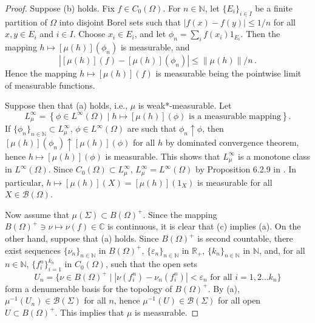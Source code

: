 \documentclass[12pt]{amsart}
\theoremstyle{definition}
\newcommand{\eps}{\varepsilon}
\newcommand{\R}{\mathbb R} %
\newcommand{\C}{\mathbb C} %
\newcommand{\N}{\mathbb N} %
\newcommand{\no}[1]{\left\|#1\right\|} %
\newcommand{\bor}[1]{\mathcal{B}(#1)} %
\newcommand{\linf}[1]{L^\infty \left( #1 \right)}
\begin{document}
\begin{proof}
Suppose (b) holds. Fix $f\in C_0 (\Omega)$. For $n \in \N$, let $\{ E_i \}_{i\in I}$ be a finite partition of $\Omega$ into disjoint Borel sets such that $|f (x) - f (y)| \leq 1/n$ for all $ x, y \in E_i$ and $i\in I$. Choose $x_i \in E_i$, and let $\phi_n = \sum_i f (x_i) 1_{E_i}$. Then the mapping $h \mapsto [\mu (h)] (\phi_n)$ is measurable, and
\begin{equation*}
\left| [\mu (h)] (f) - [\mu (h)] (\phi_n) \right| \leq \no{\mu(h)}/n \, .
\end{equation*}
Hence the mapping $h \mapsto [\mu (h)] (f)$ is measurable being the pointwise limit of measurable functions.

Suppose then that (a) holds, i.e., $\mu$ is weak*-measurable. Let
\begin{equation*}
L^\infty_\mu = \left\{ \phi\in\linf{\Omega} \mid h \mapsto [\mu (h)] (\phi) \textrm{ is a measurable mapping} \right\} .
\end{equation*}
If $\{ \phi_n \}_{n\in\N} \subset L^\infty_\mu$, $\phi\in\linf{\Omega}$ are such that $\phi_n \uparrow \phi$, then $[\mu (h)] (\phi_n) \uparrow [\mu (h)] (\phi)$ for all $h$ by dominated convergence theorem, hence $h \mapsto [\mu (h)] (\phi)$ is measurable. This shows that $L^\infty_\mu$ is a monotone class in $\linf{\Omega}$. Since $C_0 (\Omega) \subset L^\infty_\mu$, $L^\infty_\mu = \linf{\Omega}$ by Proposition 6.2.9 in \cite{AN89}. In particular, $h \mapsto [\mu (h)] (X) = [\mu (h)] (1_X)$ is measurable for all $X\in\bor{\Omega}$.

Now assume that $\mu(\Sigma) \subset B(\Omega)^+$. Since the mapping $B(\Omega)^+ \ni \nu \mapsto \nu (f) \in \C$ is continuous, it is clear that (c) implies (a). On the other hand, suppose that (a) holds. Since $B(\Omega)^+$ is second countable, there exist sequences $\{ \nu_n \}_{n\in\N}$ in $B(\Omega)^+$, $\{ \eps_n \}_{n\in\N}$ in $\R_+$, $\{ k_n \}_{n\in\N}$ in $\N$, and, for all $n\in\N$, $\{ f^n_i \}_{i=1}^{k_n}$ in $C_0 (\Omega)$, such that the open sets
\begin{equation*}
U_n = \{ \nu\in B(\Omega)^+ \mid |\nu (f^n_i) - \nu_n (f^n_i) | < \eps_n \textrm{ for all } i = 1,2 \ldots k_n \}
\end{equation*}
form a denumerable basis for the topology of $B(\Omega)^+$. By (a), $\mu^{-1} (U_n) \in \bor{\Sigma}$ for all $n$, hence $\mu^{-1} (U) \in \bor{\Sigma}$ for all open $U\subset B(\Omega)^+$. This implies that $\mu$ is measurable.
\end{proof}
\end{document}
